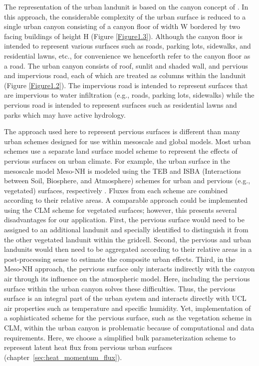 \documentclass[12pt,authoryear]{elsarticle}
\numberwithin{equation}{section} %
\begin{document}
The representation of the urban landunit is based on the canyon concept of \citet{okeBoundaryLayerClimates1987}. In this approach, the considerable complexity of the urban surface is reduced to a single urban canyon consisting of a canyon floor of width W bordered by two facing buildings of height H (Figure \ref{Figure1.3}). Although the canyon floor is intended to represent various surfaces such as roads, parking lots, sidewalks, and residential lawns, etc., for convenience we henceforth refer to the canyon floor as a road. The urban canyon consists of roof, sunlit and shaded wall, and pervious and impervious road, each of which are treated as columns within the landunit (Figure \ref{Figure1.2}). The impervious road is intended to represent surfaces that are impervious to water infiltration (e.g., roads, parking lots, sidewalks) while the pervious road is intended to represent surfaces such as residential lawns and parks which may have active hydrology.

The approach used here to represent pervious surfaces is different than many urban schemes designed for use within mesoscale and global models. Most urban schemes use a separate land surface model scheme to represent the effects of pervious surfaces on urban climate. For example, the urban surface in the mesoscale model Meso-NH is modeled using the TEB and ISBA (Interactions between Soil, Biosphere, and Atmosphere) schemes for urban and pervious (e.g., vegetated) surfaces, respectively \citep{lemonsuSimulationSummerUrban2002}. Fluxes from each scheme are combined according to their relative areas. A comparable approach could be implemented using the CLM scheme for vegetated surfaces; however, this presents several disadvantages for our application. First, the pervious surface would need to be assigned to an additional landunit and specially identified to distinguish it from the other vegetated landunit within the gridcell. Second, the pervious and urban landunits would then need to be aggregated according to their relative areas in a post-processing sense to estimate the composite urban effects. Third, in the Meso-NH approach, the pervious surface only interacts indirectly with the canyon air through its influence on the atmospheric model. Here, including the pervious surface within the urban canyon solves these difficulties. Thus, the pervious surface is an integral part of the urban system and interacts directly with UCL air properties such as temperature and specific humidity. Yet, implementation of a sophisticated scheme for the pervious surface, such as the vegetation scheme in CLM, within the urban canyon is problematic because of computational and data requirements. Here, we choose a simplified bulk parameterization scheme to represent latent heat flux from pervious urban surfaces (chapter~\ref{sec:heat_momentum_flux}).
\end{document}
